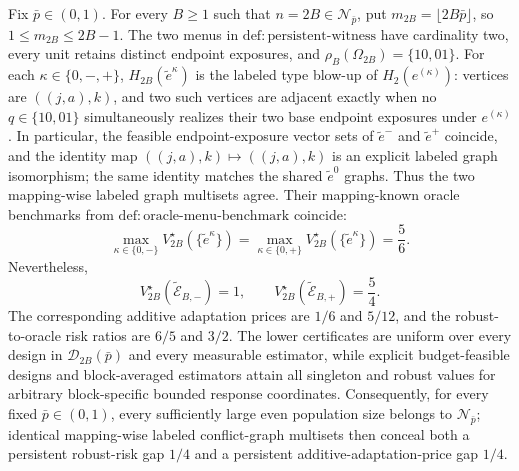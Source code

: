 Fix \(\bar p\in(0,1)\). For every \(B\ge1\) such that \(n=2B\in\mathcal N_{\bar p}\), put \(m_{2B}=\lfloor2B\bar p\rfloor\), so \(1\le m_{2B}\le2B-1\). The two menus in \(\mathrm{def{:}persistent\text{-}witness}\) have cardinality two, every unit retains distinct endpoint exposures, and \(\rho_B(\Omega_{2B})=\{10,01\}\). For each \(\kappa\in\{0,-,+\}\), \(H_{2B}(\widetilde e^\kappa)\) is the labeled type blow-up of \(H_2(e^{(\kappa)})\): vertices are \(((j,a),k)\), and two such vertices are adjacent exactly when no \(q\in\{10,01\}\) simultaneously realizes their two base endpoint exposures under \(e^{(\kappa)}\). In particular, the feasible endpoint-exposure vector sets of \(\widetilde e^-\) and \(\widetilde e^+\) coincide, and the identity map \(((j,a),k)\mapsto((j,a),k)\) is an explicit labeled graph isomorphism; the same identity matches the shared \(\widetilde e^0\) graphs. Thus the two mapping-wise labeled graph multisets agree. Their mapping-known oracle benchmarks from \(\mathrm{def{:}oracle\text{-}menu\text{-}benchmark}\) coincide:
\[
 \max_{\kappa\in\{0,-\}}V_{2B}^\star(\{\widetilde e^\kappa\})
 =\max_{\kappa\in\{0,+\}}V_{2B}^\star(\{\widetilde e^\kappa\})
 =\frac56.
\]
Nevertheless,
\[
 V_{2B}^\star(\widetilde{\mathcal E}_{B,-})=1,
 \qquad
 V_{2B}^\star(\widetilde{\mathcal E}_{B,+})=\frac54.
\]
The corresponding additive adaptation prices are \(1/6\) and \(5/12\), and the robust-to-oracle risk ratios are \(6/5\) and \(3/2\). The lower certificates are uniform over every design in \(\mathcal D_{2B}(\bar p)\) and every measurable estimator, while explicit budget-feasible designs and block-averaged estimators attain all singleton and robust values for arbitrary block-specific bounded response coordinates. Consequently, for every fixed \(\bar p\in(0,1)\), every sufficiently large even population size belongs to \(\mathcal N_{\bar p}\); identical mapping-wise labeled conflict-graph multisets then conceal both a persistent robust-risk gap \(1/4\) and a persistent additive-adaptation-price gap \(1/4\).